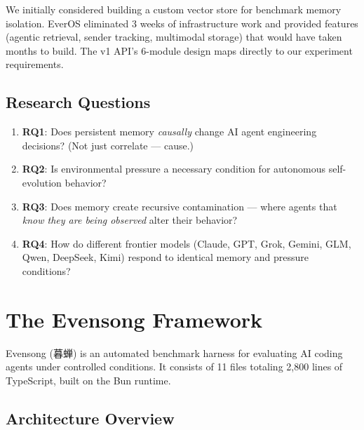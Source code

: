 \documentclass[11pt, a4paper]{article}
\begin{document}
\begin{evidence}
We initially considered building a custom vector store for benchmark memory isolation. EverOS eliminated 3 weeks of infrastructure work and provided features (agentic retrieval, sender tracking, multimodal storage) that would have taken months to build. The v1 API's 6-module design maps directly to our experiment requirements.
\end{evidence}

\subsection{Research Questions}

\begin{enumerate}
  \item \textbf{RQ1}: Does persistent memory \emph{causally} change AI agent engineering decisions? (Not just correlate --- cause.)
  \item \textbf{RQ2}: Is environmental pressure a necessary condition for autonomous self-evolution behavior?
  \item \textbf{RQ3}: Does memory create recursive contamination --- where agents that \emph{know they are being observed} alter their behavior?
  \item \textbf{RQ4}: How do different frontier models (Claude, GPT, Grok, Gemini, GLM, Qwen, DeepSeek, Kimi) respond to identical memory and pressure conditions?
\end{enumerate}

\section{The Evensong Framework}

Evensong (暮蝉) is an automated benchmark harness for evaluating AI coding agents under controlled conditions. It consists of 11 files totaling 2{,}800 lines of TypeScript, built on the Bun runtime.

\subsection{Architecture Overview}
\end{document}
